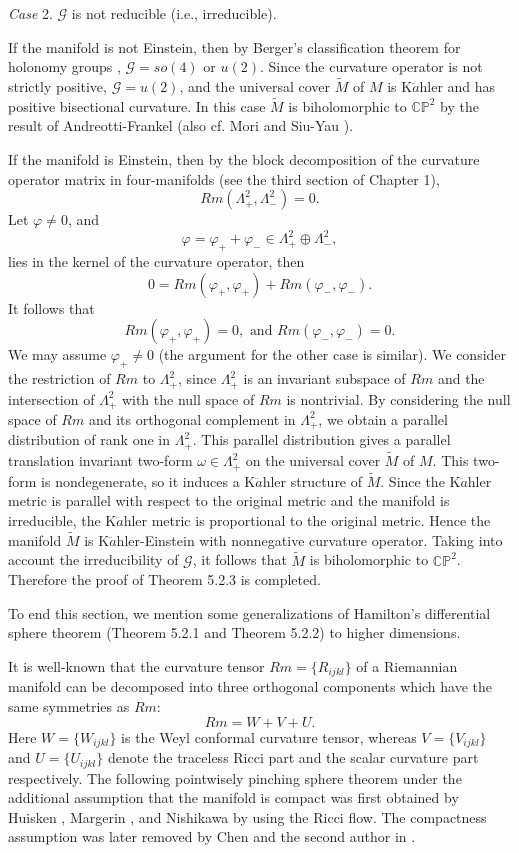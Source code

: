 \smallskip
{\it Case} 2. $\mathcal{G}$ is not reducible (i.e., irreducible).

\smallskip
If the manifold is not Einstein, then by Berger's classification
theorem for holonomy groups \cite{Ber}, $\mathcal{G}=so(4)$ or
$u(2)$. Since the curvature operator is not strictly positive,
$\mathcal{G}=u(2)$, and the universal cover $\tilde{M}$ of $M$ is
K$\ddot{a}$hler and has positive bisectional curvature. In this
case $\tilde{M}$ is biholomorphic to $\mathbb{C}\mathbb{P}^{2}$ by
the result of Andreotti-Frankel \cite{Ft} (also cf. Mori
\cite{Mori} and Siu-Yau \cite{SiY}).

If the manifold is Einstein, then by the block decomposition of
the curvature operator matrix in four-manifolds (see the third
section of Chapter 1),
$$
Rm(\Lambda^{2}_{+},\Lambda^{2}_{-})=0.
$$
Let $\varphi\neq0$, and
$$
\varphi=\varphi_{+}+\varphi_{-}\in
  \Lambda^{2}_{+}\oplus\Lambda^{2}_{-},
$$
lies in the kernel of the curvature operator, then
$$
   0=Rm(\varphi_{+},\varphi_{+})+Rm(\varphi_{-},\varphi_{-}).
$$
It follows that
$$
   Rm(\varphi_{+},\varphi_{+})=0, \mbox{ and }
   Rm(\varphi_{-},\varphi_{-})=0.
$$
We may assume $\varphi_{+}\neq 0$ (the argument for the other case
is similar).  We consider the restriction of $Rm$ to
$\Lambda^{2}_{+}$, since $\Lambda^{2}_{+}$ is an invariant
subspace of $R{m}$ and the intersection of $\Lambda^{2}_{+}$ with
the null space of $Rm$ is nontrivial. By considering the null
space of $Rm$ and its orthogonal complement in $\Lambda^{2}_{+}$,
we obtain a parallel distribution of rank one in
$\Lambda^{2}_{+}$. This parallel distribution gives a parallel
translation invariant two-form $\omega \in \Lambda^{2}_{+}$ on the
universal cover $\tilde{M}$ of $M$. This two-form is
nondegenerate, so it induces a K$\ddot{a}$hler structure of
$\tilde{M}$. Since the K$\ddot{a}$hler metric is parallel with
respect to the original metric and the manifold is irreducible,
the K$\ddot{a}$hler metric is proportional to the original metric.
Hence the manifold $\tilde{M}$ is K$\ddot{a}$hler-Einstein with
nonnegative curvature operator. Taking into account the
irreducibility of $\mathcal{G}$, it follows that $\tilde{M}$ is
biholomorphic to $\mathbb{C}\mathbb{P}^{2}$.  Therefore the proof
of Theorem 5.2.3 is completed.
\endproof

To end this section, we mention some generalizations of Hamilton's
differential sphere theorem (Theorem 5.2.1 and Theorem 5.2.2) to
higher dimensions.


It is well-known that the curvature tensor $Rm=\{R_{ijkl}\}$ of a
Riemannian manifold can be decomposed into three orthogonal
components which have the same symmetries as $Rm$:
$$
Rm=W+V+U.
$$
Here $W=\{W_{ijkl}\}$ is the Weyl conformal curvature tensor,
whereas $V=\{V_{ijkl}\}$ and $U=\{U_{ijkl}\}$ denote the traceless
Ricci part and the scalar curvature part respectively. The
following pointwisely pinching sphere theorem under the additional
assumption that the manifold is compact was first obtained by
Huisken \cite{Hu}, Margerin \cite{Mar94}, \cite{Mar98} and
Nishikawa \cite{Ns} by using the Ricci flow. The compactness
assumption was later removed by Chen and the second author in
\cite{CZ00}.

